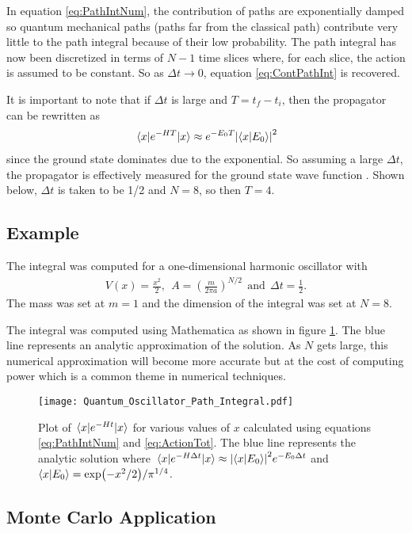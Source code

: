 \documentclass[11pt]{article}
\begin{document}
In equation \ref{eq:PathIntNum}, the contribution of paths are exponentially damped so quantum mechanical paths (paths far from the classical path) contribute very little to the path integral because of their low probability. The path integral has now been discretized in terms of $N-1$ time slices where, for each slice, the action is assumed to be constant. So as $\Delta t\to0$, equation \ref{eq:ContPathInt} is recovered.

It is important to note that if $\Delta t$ is large and $T=t_f-t_i$, then the propagator can be rewritten as
\begin{align}
	\mel{x}{e^{-HT}}{x}\approx e^{-E_0T}\abs{\bra{x}\ket{E_0}}^2
\end{align}
since the ground state dominates due to the exponential. So assuming a large $\Delta t$, the propagator is effectively measured for the ground state wave function \cite{MainPaper}. Shown below, $\Delta t$ is taken to be 1/2 and $N=8$, so then $T=4$.

\subsection{Example}
The integral was computed for a one-dimensional harmonic oscillator with
\begin{align}
V(x)=\frac{x^2}{2},\ \ A=\left(\frac{m}{2\pi a}\right)^{N/2}\ \ \text{and}\ \ \Delta t=\frac{1}{2}.
\end{align}
The mass was set at $m=1$ and the dimension of the integral was set at $N=8$. 

The integral was computed using Mathematica as shown in figure \ref{fig:QHO}. The blue line represents an analytic approximation of the solution. As $N$ gets large, this numerical approximation will become more accurate but at the cost of computing power  which is a common theme in numerical techniques. 
\begin{figure}[h]
	\centering
	\texttt{[image: Quantum\_Oscillator\_Path\_Integral.pdf]}
	\caption{Plot of $\mel{x}{e^{-Ht}}{x}$ for various values of $x$ calculated using equations \ref{eq:PathIntNum} and \ref{eq:ActionTot}. The blue line represents the analytic solution where $\mel{x}{e^{-H\Delta t}}{x}\approx\abs{\bra{x}\ket{E_0}}^2e^{-E_0\Delta t}$ and $\bra{x}\ket{E_0}=\exp(-x^2/2)/\pi^{1/4}$.}
	\label{fig:QHO}
\end{figure}

\subsection{Monte Carlo Application}
\end{document}
